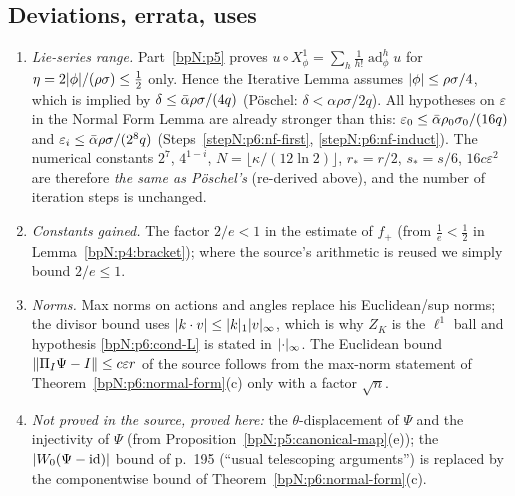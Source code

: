\subsection{Deviations, errata, uses}\label{bpN:p6:s-dev}

\begin{remark}\label{bpN:p6:deviations}
\begin{enumerate}[label=(\arabic*)]
\item \emph{Lie-series range.} Part~\ref{bpN:p5} proves $u\circ X^1_\phi=\sum_h\frac1{h!}\operatorname{ad}^h_\phi u$ for $\eta=2\lvert \phi\rvert/(\rho\sigma)\le\frac12$ only. Hence the Iterative Lemma assumes $\lvert \phi\rvert\le\rho\sigma/4$, which is implied by $\delta\le\bar\alpha\rho\sigma/(4q)$ (P\"oschel: $\delta<\alpha\rho\sigma/2q$). All hypotheses on $\varepsilon$ in the Normal Form Lemma are already stronger than this: $\varepsilon_0\le\bar\alpha\rho_0\sigma_0/(16q)$ and $\varepsilon_i\le\bar\alpha\rho\sigma/(2^8q)$ (Steps~\ref{stepN:p6:nf-first}, \ref{stepN:p6:nf-induct}). The numerical constants $2^7$, $4^{1-i}$, $N=\lfloor\kappa/(12\ln2)\rfloor$, $r_*=r/2$, $s_*=s/6$, $16c\varepsilon^2$ are therefore \emph{the same as P\"oschel's} (re-derived above), and the number of iteration steps is unchanged.
\item \emph{Constants gained.} The factor $2/e<1$ in the estimate of $f_+$ (from $\frac1e<\frac12$ in Lemma~\ref{bpN:p4:bracket}); where the source's arithmetic is reused we simply bound $2/e\le1$.
\item \emph{Norms.} Max norms on actions and angles replace his Euclidean/sup norms; the divisor bound uses $\lvert k\cdot v\rvert\le\lvert k\rvert_1\lvert v\rvert_\infty$, which is why $Z_K$ is the $\ell^1$ ball and hypothesis \ref{bpN:p6:cond-L} is stated in $\lvert \cdot\rvert_\infty$. The Euclidean bound $\lVert \Pi_I\Psi-I\rVert\le c\varepsilon r$ of the source follows from the max-norm statement of Theorem~\ref{bpN:p6:normal-form}(c) only with a factor $\sqrt n$.
\item \emph{Not proved in the source, proved here:} the $\theta$-displacement of $\Psi$ and the injectivity of $\Psi$ (from Proposition~\ref{bpN:p5:canonical-map}(e)); the $\lvert W_0(\Psi-\mathrm{id})\rvert$ bound of p.~195 (``usual telescoping arguments'') is replaced by the componentwise bound of Theorem~\ref{bpN:p6:normal-form}(c). 

\end{enumerate}
\end{remark}
